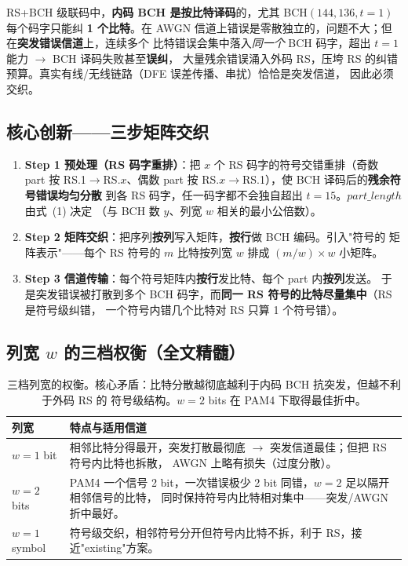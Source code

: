 \documentclass[11pt,a4paper]{article}
\begin{document}
RS+BCH 级联码中，\textbf{内码 BCH 是按比特译码}的，尤其 BCH$(144,136,t{=}1)$ 每个码字只能纠
\textbf{1 个比特}。在 AWGN 信道上错误是零散独立的，问题不大；但在\textbf{突发错误信道}上，连续多个
比特错误会集中落入\emph{同一个} BCH 码字，超出 $t{=}1$ 能力 $\to$ BCH 译码失败甚至\textbf{误纠}，
大量残余错误涌入外码 RS，压垮 RS 的纠错预算。真实有线/无线链路（DFE 误差传播、串扰）恰恰是突发信道，
因此必须交织。

\subsection{核心创新——三步矩阵交织}

\begin{keybox}[title=\textbf{矩阵交织三步（论文 Fig.~2--4）}]
\begin{enumerate}[leftmargin=1.5em, itemsep=2pt]
\item \textbf{Step 1 预处理（RS 码字重排）}：把 $x$ 个 RS 码字的符号交错重排（奇数 part 按
      RS.1$\to$RS.$x$、偶数 part 按 RS.$x\to$RS.1），使 BCH 译码后的\textbf{残余符号错误均匀分散}
      到各 RS 码字，任一码字都不会独自超出 $t{=}15$。$part\_length$ 由式~(1) 决定
      （与 BCH 数 $y$、列宽 $w$ 相关的最小公倍数）。
\item \textbf{Step 2 矩阵交织}：把序列\textbf{按列}写入矩阵，\textbf{按行}做 BCH 编码。引入"符号的
      矩阵表示"——每个 RS 符号的 $m$ 比特按列宽 $w$ 排成 $(m/w)\times w$ 小矩阵。
\item \textbf{Step 3 信道传输}：每个符号矩阵内\textbf{按行}发比特、每个 part 内\textbf{按列}发送。
      于是突发错误被打散到多个 BCH 码字，而\textbf{同一 RS 符号的比特尽量集中}（RS 是符号级纠错，
      一个符号内错几个比特对 RS 只算 1 个符号错）。
\end{enumerate}
\end{keybox}

\subsection{列宽 $w$ 的三档权衡（全文精髓）}

\begin{table}[!ht]
\centering
\begin{tabularx}{\textwidth}{lX}
\toprule
列宽 & 特点与适用信道 \\
\midrule
$w=1$ bit    & 相邻比特分得最开，突发打散最彻底 $\to$ 突发信道最佳；但把 RS 符号内比特也拆散，
               AWGN 上略有损失（过度分散）。\\
$w=2$ bits   & PAM4 一个信号 2 bit，一次错误极少 2 bit 同错，$w{=}2$ 足以隔开相邻信号的比特，
               同时保持符号内比特相对集中——突发/AWGN 折中最好。\\
$w=1$ symbol & 符号级交织，相邻符号分开但符号内比特不拆，利于 RS，接近"existing"方案。\\
\bottomrule
\end{tabularx}
\caption{三档列宽的权衡。核心矛盾：比特分散越彻底越利于内码 BCH 抗突发，但越不利于外码 RS 的
符号级结构。$w{=}2$ bits 在 PAM4 下取得最佳折中。}
\end{table}
\end{document}
